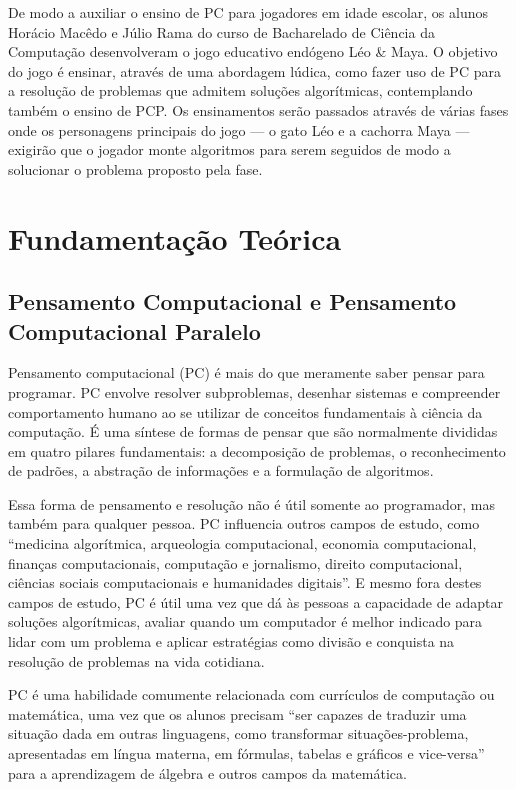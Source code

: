 \documentclass[conference]{IEEEtran}
\begin{document}
De modo a auxiliar o ensino de PC para jogadores em idade escolar,  os alunos Horácio Macêdo e Júlio Rama do curso de Bacharelado de Ciência da Computação desenvolveram o jogo educativo endógeno Léo \& Maya. O objetivo do jogo é ensinar, através de uma abordagem lúdica, como fazer uso de PC para a resolução de problemas que admitem soluções algorítmicas, contemplando também o ensino de PCP. Os ensinamentos serão passados através de várias fases onde os personagens principais do jogo — o gato Léo e a cachorra Maya — exigirão que o jogador monte algoritmos para serem seguidos de modo a solucionar o problema proposto pela fase.

\section{Fundamentação Teórica}

\subsection{Pensamento Computacional e Pensamento Computacional Paralelo}

Pensamento computacional (PC) é mais do que meramente saber pensar para programar. PC envolve resolver subproblemas, desenhar sistemas e compreender comportamento humano ao se utilizar de conceitos fundamentais à ciência da computação\cite{b2}. É uma síntese de formas de pensar que são normalmente divididas em quatro pilares fundamentais: a decomposição de problemas, o reconhecimento de padrões, a abstração de informações e a formulação de algoritmos\cite{b6}.

 Essa forma de pensamento e resolução não é útil somente ao programador, mas também para qualquer pessoa. PC influencia outros campos de estudo, como “medicina algorítmica, arqueologia computacional, economia computacional, finanças computacionais, computação e jornalismo, direito computacional, ciências sociais computacionais e humanidades digitais\cite{b7}”. E mesmo fora destes campos de estudo, PC é útil uma vez que dá às pessoas a capacidade de adaptar soluções algorítmicas, avaliar quando um computador é melhor indicado para lidar com um problema e aplicar estratégias como divisão e conquista na resolução de problemas na vida cotidiana\cite{b7}.

PC é uma habilidade comumente relacionada com currículos de computação\cite{b8} ou matemática, uma vez que os alunos precisam “ser capazes de traduzir uma situação dada em outras linguagens, como transformar situações-problema, apresentadas em língua materna, em fórmulas, tabelas e gráficos e vice-versa”\cite{b4} para a aprendizagem de álgebra e outros campos da matemática. 
\end{document}
